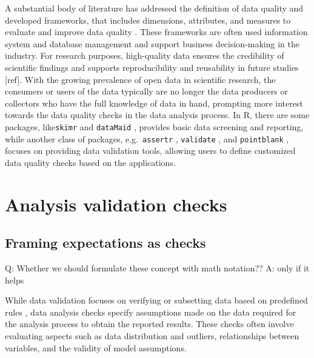 \documentclass[
]{jds}
\begin{document}
A substantial body of literature has addressed the definition of data
quality \citep[more]{8642813} and developed frameworks, that includes
dimensions, attributes, and measures to evaluate and improve data
quality
\citep{cai2015challenges, wang1996beyond, 6204995, woodall2014classification}.
These frameworks are often used information system and database
management and support business decision-making in the industry. For
research purposes, high-quality data ensures the credibility of
scientific findings and supports reproducibility and reusability in
future studies {[}ref{]}. With the growing prevalence of open data in
scientific research, the consumers or users of the data typically are no
longer the data producers or collectors who have the full knowledge of
data in hand, prompting more interest towards the data quality checks in
the data analysis process. In R, there are some packages,
like\texttt{skimr} \citep{skimr} and \texttt{dataMaid} \citep{dataMaid},
provides basic data screening and reporting, while another class of
packages, e.g.~\texttt{assertr} \citep{assertr}, \texttt{validate}
\citep{validate}, and \texttt{pointblank} \citep{pointblank}, focuses on
providing data validation tools, allowing users to define customized
data quality checks based on the applications.

\section{Analysis validation checks}\label{sec-plan}

\subsection{Framing expectations as
checks}\label{framing-expectations-as-checks}

Q: Whether we should formulate these concept with math notation?? A:
only if it helps

While data validation focuses on verifying or subsetting data based on
predefined rules \citep{zio2015methodology}, data analysis checks
specify assumptions made on the data required for the analysis process
to obtain the reported results. These checks often involve evaluating
aspects such as data distribution and outliers, relationships between
variables, and the validity of model assumptions.
\end{document}
